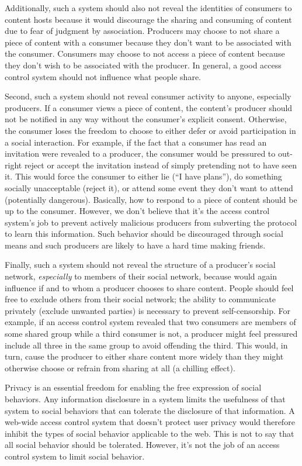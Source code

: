 \documentclass[pdftex,12pt,a4papaer,twoside,notitlepage]{report}
\begin{document}
Additionally, such a system should also not reveal the identities of consumers
to content hosts because it would discourage the sharing and consuming of
content due to fear of judgment by association. Producers may choose to not
share a piece of content with a consumer because they don't want to be
associated with the consumer. Consumers may choose to not access a piece of
content because they don't wish to be associated with the producer. In general,
a good access control system should not influence what people share.

Second, such a system should not reveal consumer activity to anyone, especially
producers. If a consumer views a piece of content, the content's producer should
not be notified in any way without the consumer's explicit consent. Otherwise,
the consumer loses the freedom to choose to either defer or avoid participation
in a social interaction. For example, if the fact that a consumer has read an
invitation were revealed to a producer, the consumer would be pressured to
out-right reject or accept the invitation instead of simply pretending not to
have seen it. This would force the consumer to either lie (``I have plans''), do
something socially unacceptable (reject it), or attend some event they don't
want to attend (potentially dangerous). Basically, how to respond to a piece of
content should be up to the consumer. However, we don't believe that it's the
access control system's job to prevent actively malicious producers from
subverting the protocol to learn this information. Such behavior should be
discouraged through social means and such producers are likely to have a hard
time making friends.

Finally, such a system should not reveal the structure of a producer's social
network, \emph{especially} to members of their social network, because would
again influence if and to whom a producer chooses to share content. People
should feel free to exclude others from their social network; the ability to
communicate privately (exclude unwanted parties) is necessary to prevent
self-censorship. For example, if an access control system revealed that two
consumers are members of some shared group while a third consumer is not, a
producer might feel pressured include all three in the same group to avoid
offending the third. This would, in turn, cause the producer to either share
content more widely than they might otherwise choose or refrain from sharing at
all (a chilling effect).

Privacy is an essential freedom for enabling the free expression of social
behaviors. Any information disclosure in a system limits the usefulness of that
system to social behaviors that can tolerate the disclosure of that information.
A web-wide access control system that doesn't protect user privacy would
therefore inhibit the types of social behavior applicable to the web. This is
not to say that all social behavior should be tolerated. However, it's not the
job of an access control system to limit social behavior.
\end{document}
